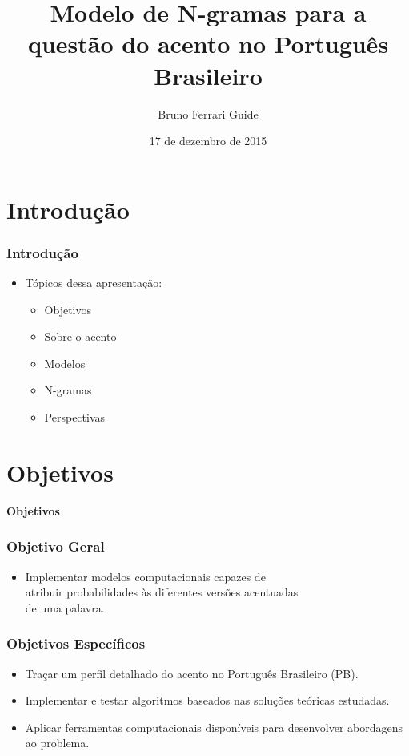 \documentclass[xcolor=table]{beamer}
\author{Bruno Ferrari Guide}
\title{Modelo de N-gramas para a questão do acento no Português Brasileiro}
\institute{Orientador: Marcelo Barra Ferreira\\ Departamento de Linguística - FFLCH - USP}
\date{17 de dezembro de 2015}
\begin{document}
	\maketitle
	\section{Introdução}
	\begin{frame}
		\frametitle{Introdução}
		\begin{itemize}
			\item Tópicos dessa apresentação:\\
			\begin{itemize}
				\item Objetivos\\
				\item Sobre o acento\\
				\item Modelos\\
				\item N-gramas\\
				\item Perspectivas\\
			\end{itemize}
		\end{itemize}
	\end{frame}
	\section{Objetivos}
	\begin{frame}
		\centering
		\textbf{Objetivos}
	\end{frame}
	\begin{frame}
		\frametitle{Objetivo Geral}
		\begin{itemize}
			\item Implementar modelos computacionais capazes de\\ atribuir probabilidades às diferentes versões acentuadas\\ de uma palavra.\\
			
			
		\end{itemize}
	\end{frame}
	\begin{frame}
		\frametitle{Objetivos Específicos}
		\begin{itemize}
			\item Traçar um perfil detalhado do acento no Português Brasileiro (PB).\\
			\item Implementar e testar algoritmos baseados nas soluções teóricas estudadas.\\
			\item Aplicar ferramentas computacionais disponíveis para desenvolver abordagens ao problema.\\
			
		\end{itemize}
		
	\end{frame}
\end{document}
